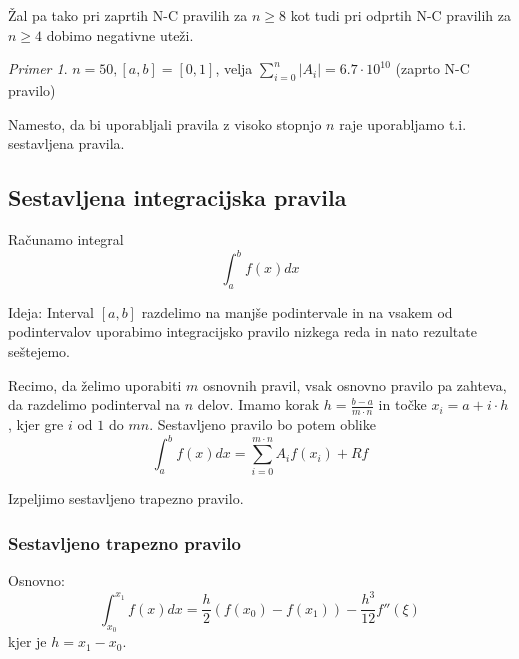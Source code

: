 \documentclass[a4paper,12pt]{article}
\theoremstyle{definition}
\theoremstyle{remark}
\newtheorem*{ex}{Primer}
\begin{document}
Žal pa tako pri zaprtih N-C pravilih za $n \geq 8$ kot tudi pri odprtih N-C pravilih za $n \geq 4$ dobimo negativne uteži.

\begin{ex}
    $n = 50, [a, b] = [0, 1]$, velja $\sum_{i=0}^{n} |A_i| = 6.7 \cdot 10^{10}$ (zaprto N-C pravilo)
\end{ex}

Namesto, da bi uporabljali pravila z visoko stopnjo $n$ raje uporabljamo t.i. sestavljena pravila.
\subsection{Sestavljena integracijska pravila}
Računamo integral
\begin{equation*}
    \int_{a}^{b} f(x) dx
\end{equation*}

Ideja: Interval $[a, b]$ razdelimo na manjše podintervale in na vsakem od podintervalov uporabimo integracijsko pravilo nizkega reda in nato 
rezultate seštejemo.

Recimo, da želimo uporabiti $m$ osnovnih pravil, vsak osnovno pravilo pa zahteva, da razdelimo podinterval na $n$ delov.
Imamo korak $h = \frac{b-a}{m \cdot n}$ in točke $x_i = a + i\cdot h$, kjer gre $i$ od $1$ do $mn$.
Sestavljeno pravilo bo potem oblike
\begin{equation*}
    \int_{a}^{b} f(x) dx = \sum_{i = 0}^{m \cdot n} A_i f(x_i) + Rf
\end{equation*}

Izpeljimo sestavljeno trapezno pravilo.
\subsubsection{Sestavljeno trapezno pravilo}

Osnovno:
\begin{equation*}
    \int_{x_0}^{x_1} f(x) dx = \frac{h}{2} (f(x_0) - f(x_1)) - \frac{h^3}{12} f''(\xi)
\end{equation*}
kjer je $h = x_1 - x_0$.
\end{document}
